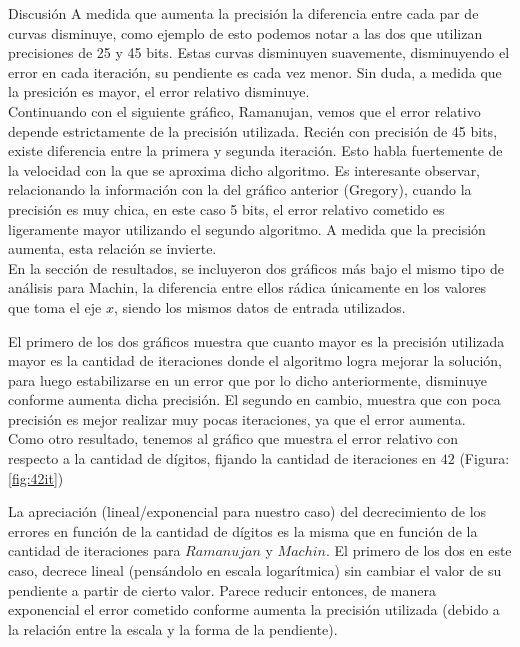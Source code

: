 \begin{section}{Discusión}
	A medida que aumenta la precisión la diferencia entre cada par de curvas disminuye, como ejemplo de esto podemos notar a las dos que utilizan precisiones de 25 y 45 bits. Estas curvas disminuyen suavemente, disminuyendo el error en cada iteración, su pendiente es cada vez menor. Sin duda, a medida que la presición es mayor, el error relativo disminuye.\\

	
	Continuando con el siguiente gráfico, Ramanujan, vemos que el error relativo depende estrictamente de la precisión utilizada. Recién con precisión de 45 bits, existe diferencia entre la primera y segunda iteración. Esto habla fuertemente de la velocidad con la que se aproxima dicho algoritmo. Es interesante observar, relacionando la información con la del gráfico anterior (Gregory), cuando la precisión es muy chica, en este caso 5 bits, el error relativo cometido es ligeramente mayor utilizando el segundo algoritmo. A medida que la precisión aumenta, esta relación se invierte.\\
	
	En la sección de resultados, se incluyeron dos gráficos más bajo el mismo tipo de análisis para Machin, la diferencia entre ellos rádica únicamente en los valores que toma el eje $x$, siendo los mismos datos de entrada utilizados.
	
	El primero de los dos gráficos muestra que cuanto mayor es la precisión utilizada mayor es la cantidad de iteraciones donde el algoritmo logra mejorar la solución, para luego estabilizarse en un error que por lo dicho anteriormente, disminuye conforme aumenta dicha precisión. El segundo en cambio, muestra que con poca precisión es mejor realizar muy pocas iteraciones, ya que el error aumenta.\\
	
	Como otro resultado, tenemos al gráfico que muestra el error relativo con respecto a la cantidad de dígitos, fijando la cantidad de iteraciones en $42$ (Figura:\ref{fig:42it})
	
	La apreciación (lineal/exponencial para nuestro caso) del decrecimiento de los errores en función de la cantidad de dígitos es la misma que en función de la cantidad de iteraciones para $Ramanujan$ y $Machin$. El primero de los dos en este caso, decrece lineal (pensándolo en escala logarítmica) sin cambiar el valor de su pendiente a partir de cierto valor. Parece reducir entonces, de manera exponencial el error cometido conforme aumenta la precisión utilizada (debido a la relación entre la escala y la forma de la pendiente).
	

\end{section}
